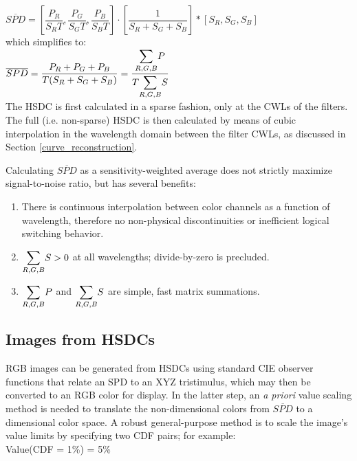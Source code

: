 \documentclass[twocolumn,10pt]{asme2ej}
\begin{document}
\noindent $\overline{SPD} = \left[ \dfrac{P_R}{S_RT},\dfrac{P_G}{S_GT},\dfrac{P_B}{S_BT} \right] \cdot \left[ \dfrac{1}{S_R+S_G+S_B}\right] * \left[ S_R, S_G, S_B \right] $ \\

\noindent which simplifies to:\\

\noindent $\overline{SPD} = \dfrac{P_R+P_G+P_B}{T(S_R+S_G+S_B)} =  \dfrac{\mathlarger{\sum_{R,G,B}}P}{T \mathlarger{\sum_{R,G,B}}S}$ \\

The HSDC is first calculated in a sparse fashion, only at the CWLs of the filters. The full (i.e. non-sparse) HSDC is then calculated by means of cubic interpolation in the wavelength domain between the filter CWLs, as discussed in Section \ref{curve_reconstruction}.

Calculating $\overline{SPD}$ as a sensitivity-weighted average does not strictly maximize signal-to-noise ratio, but has several benefits:

\begin{enumerate}
\item There is continuous interpolation between color channels as a function of wavelength, therefore no non-physical discontinuities or inefficient logical switching behavior.
\item $\mathlarger{\sum_{R,G,B}}S > 0$ at all wavelengths; divide-by-zero is precluded.
\item $\mathlarger{\sum_{R,G,B}}P$ and $\mathlarger{\sum_{R,G,B}}S$ are simple, fast matrix summations.
\end{enumerate}

\subsection{Images from HSDCs}

\noindent RGB images can be generated from HSDCs using standard CIE observer functions that relate an SPD to an XYZ tristimulus, which may then be converted to an RGB color for display. In the latter step, an \emph{a priori} value scaling method is needed to translate the non-dimensional colors from $\overline{SPD}$ to a dimensional color space. A robust general-purpose method is to scale the image's value limits by specifying two CDF pairs; for example:\\

Value(CDF = 1\%) = 5\%\\
\end{document}
